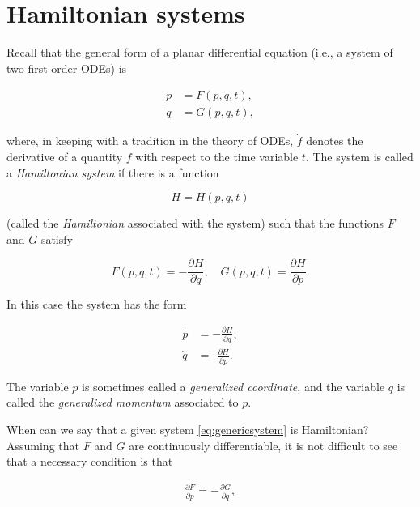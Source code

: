 \documentclass[11pt]{report}
\theoremstyle{plain}
\theoremstyle{definition}
\begin{document}
\section{Hamiltonian systems}

Recall that the general form of a planar differential
equation (i.e., a system of two first-order ODEs) is

\begin{equation*} \tag{1}\label{eq:genericsystem}
\begin{split}
\dot{p} &= F(p,q,t), \\
\dot{q} &= G(p,q,t),
\end{split}
\end{equation*}

\noindent where, in keeping with a tradition in the theory of
ODEs, $\dot{f}$ denotes the derivative of a quantity
$f$ with respect to the time variable $t$. The system
is called a \emph{Hamiltonian system} if there is a
function

\[
H=H(p,q,t)
\]

\noindent (called the \emph{Hamiltonian} associated with the system)
such that the functions $F$ and $G$ satisfy

\[
F(p,q,t) = -\frac{\partial H}{\partial q}, \quad G(p,q,t) = \frac{\partial H}{\partial p}.
\]

\noindent In this case the system has the form

\begin{equation*} \tag{2}\label{eq:hamiltoniansystem}
\begin{split}
\dot{p} &= -\frac{\partial H}{\partial q}, \\
\dot{q} &= \ \ \frac{\partial H}{\partial p}.
\end{split}
\end{equation*}

\noindent The variable $p$ is sometimes called a \emph{generalized
coordinate}, and the variable $q$ is called the
\emph{generalized momentum} associated to $p$.

When can we say that a given system
\eqref{eq:genericsystem} is Hamiltonian? Assuming that $F$
and $G$ are continuously differentiable, it is not
difficult to see that a necessary condition is that

\begin{equation*} \tag{3}\label{eq:hamiltonian-sufficient}
\begin{split}
\frac{\partial F}{\partial p} = -\frac{\partial G}{\partial q},
\end{split}
\end{equation*}
\end{document}
